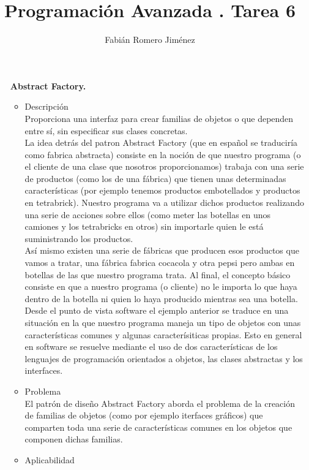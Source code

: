 \documentclass{article}
\title{Programación Avanzada . Tarea 6}
\author{Fabián Romero Jiménez}
\begin{document}
\maketitle
\begin{enumerate}


\item[\bf{Abstract Factory.}]
\begin{itemize}
\item{Descripción}\\

Proporciona una interfaz para crear familias de objetos o que dependen entre sí, sin especificar sus clases concretas.\\
La idea detrás del patron Abstract Factory (que en español se traduciría como fabrica abstracta) consiste en la noción de que nuestro programa (o el cliente de una clase que nosotros proporcionamos) trabaja con una serie de productos (como los de una fábrica) que tienen unas determinadas características (por ejemplo tenemos productos embotellados y productos en tetrabrick). Nuestro programa va a utilizar dichos productos realizando una serie de acciones sobre ellos (como meter las botellas en unos camiones y los tetrabricks en otros) sin importarle quien le está suministrando los productos.\\
Así mismo existen una serie de fábricas que producen esos productos que vamos a tratar, una fábrica fabrica cocacola y otra pepsi pero ambas en botellas de las que nuestro programa trata. Al final, el concepto básico consiste en que a nuestro programa (o cliente) no le importa lo que haya dentro de la botella ni quien lo haya producido mientras sea una botella.
Desde el punto de vista software el ejemplo anterior se traduce en una situación en la que nuestro programa maneja un tipo de objetos con unas características comunes y algunas caracterísiticas propias. Esto en general en software se resuelve mediante el uso de dos características de los lenguajes de programación orientados a objetos, las clases abstractas y los interfaces.\\

\item{Problema}\\

El patrón de diseño Abstract Factory aborda el problema de la creación de familias de objetos (como por ejemplo iterfaces gráficos) que comparten toda una serie de características comunes en los objetos que componen dichas familias.

\item{Aplicabilidad}\\


\end{itemize}
\end{enumerate}
\end{document}
